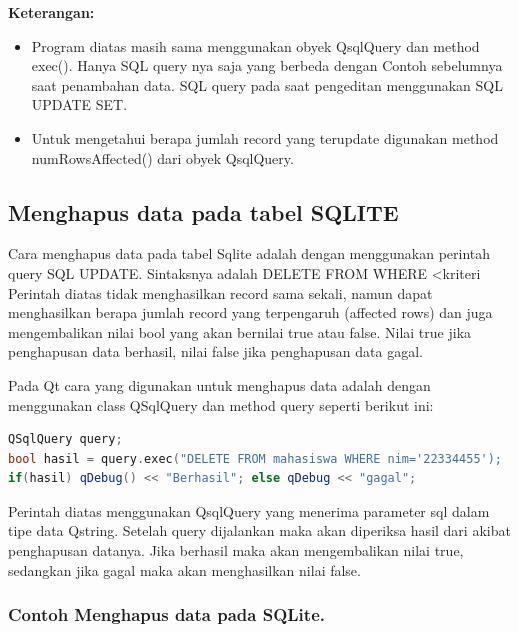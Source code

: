 \textbf{Keterangan:}

\begin{itemize}

\item
  Program diatas masih sama menggunakan obyek QsqlQuery dan method
  exec(). Hanya SQL query nya saja yang berbeda dengan Contoh sebelumnya
  saat penambahan data. SQL query pada saat pengeditan menggunakan SQL
  UPDATE SET.
\item
  Untuk mengetahui berapa jumlah record yang terupdate digunakan method
  numRowsAffected() dari obyek QsqlQuery.
\end{itemize}

\subsection{Menghapus data pada tabel SQLITE}\label{menghapus-data-pada-tabel-sqlite}

Cara menghapus data pada tabel Sqlite adalah dengan menggunakan perintah
query SQL UPDATE. Sintaksnya adalah DELETE FROM WHERE \textless{}kriteri
Perintah diatas tidak menghasilkan record sama sekali, namun dapat
menghasilkan berapa jumlah record yang terpengaruh (affected rows) dan
juga mengembalikan nilai bool yang akan bernilai true atau false. Nilai
true jika penghapusan data berhasil, nilai false jika penghapusan data
gagal.

Pada Qt cara yang digunakan untuk menghapus data adalah dengan
menggunakan class QSqlQuery dan method query seperti berikut ini:

\begin{lstlisting}[language=c++, caption=menghapus data adalah dengan menggunakan class QSqlQuery dan method query]
QSqlQuery query;
bool hasil = query.exec("DELETE FROM mahasiswa WHERE nim='22334455');
if(hasil) qDebug() << "Berhasil"; else qDebug << "gagal";
\end{lstlisting}

Perintah diatas menggunakan QsqlQuery yang menerima parameter sql dalam
tipe data Qstring. Setelah query dijalankan maka akan diperiksa hasil
dari akibat penghapusan datanya. Jika berhasil maka akan mengembalikan
nilai true, sedangkan jika gagal maka akan menghasilkan nilai false.

\subsubsection*{Contoh  Menghapus data pada SQLite.}


